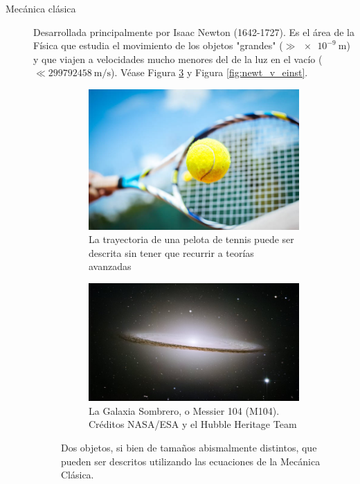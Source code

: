 \begin{description}
    \item [Mec\'anica cl\'asica] Desarrollada principalmente por Isaac Newton (1642-1727). Es el \'area de la F\'isica que estudia el movimiento de los objetos "grandes" ($\gg\SI{e-9}{\meter}$) y que viajen a velocidades mucho menores del de la luz en el vac\'io ($\ll\SI{299792458}{\meter/\second}$). V\'ease Figura \ref{fig:mec_clasica} y Figura \ref{fig:newt_v_einst}.
    
\begin{figure}
\centering
\begin{subfigure}{.45\textwidth}
  \centering
  \includegraphics[width=.95\textwidth]{lecture1/tennis.jpg}
  \caption{La trayectoria de una pelota de tennis puede ser descrita sin tener que recurrir a teor\'ias avanzadas}
  \label{fig:sub_tennis}
\end{subfigure}%
\hfill
\begin{subfigure}{.45\textwidth}
  \centering
  \includegraphics[width=.95\textwidth]{lecture1/sombrero.jpg}
  \caption{La Galaxia Sombrero, o Messier 104 (M104). Cr\'editos NASA/ESA y el Hubble Heritage Team}
  \label{fig:sub_galaxia}
\end{subfigure}
\caption{Dos objetos, si bien de tama\~nos abismalmente distintos, que pueden ser descritos utilizando las ecuaciones de la Mec\'anica Cl\'asica.}
\label{fig:mec_clasica}
\end{figure}
    

\end{description}
